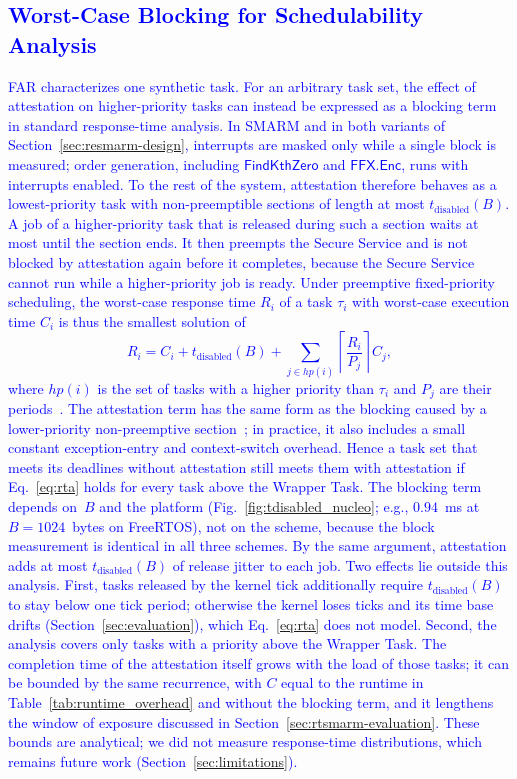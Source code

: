 \documentclass[journal]{IEEEtran}
\newcommand\ben[1]{\textcolor{blue}{#1}}
\begin{document}
\subsection{\ben{Worst-Case Blocking for Schedulability Analysis}}
\label{sec:blocking}
\ben{FAR characterizes one synthetic task.
For an arbitrary task set, the effect of attestation on higher-priority tasks can instead be expressed as a blocking term in standard response-time analysis.
In SMARM and in both variants of Section~\ref{sec:resmarm-design}, interrupts are masked only while a single block is measured; order generation, including $\mathsf{FindKthZero}$ and $\mathsf{FFX.Enc}$, runs with interrupts enabled.
To the rest of the system, attestation therefore behaves as a lowest-priority task with non-preemptible sections of length at most $t_{\text{disabled}}(B)$.
A job of a higher-priority task that is released during such a section waits at most until the section ends.
It then preempts the Secure Service and is not blocked by attestation again before it completes, because the Secure Service cannot run while a higher-priority job is ready.
Under preemptive fixed-priority scheduling, the worst-case response time $R_i$ of a task $\tau_i$ with worst-case execution time $C_i$ is thus the smallest solution of
\begin{equation}
  R_i = C_i + t_{\text{disabled}}(B) + \sum_{j \in hp(i)} \left\lceil \frac{R_i}{P_j} \right\rceil C_j,
  \label{eq:rta}
\end{equation}
where $hp(i)$ is the set of tasks with a higher priority than $\tau_i$ and $P_j$ are their periods~\cite{joseph1986response,audsley1993applying,buttazzo2011hard}.
The attestation term has the same form as the blocking caused by a lower-priority non-preemptive section~\cite{sha1990priority}; in practice, it also includes a small constant exception-entry and context-switch overhead.
Hence a task set that meets its deadlines without attestation still meets them with attestation if Eq.~\eqref{eq:rta} holds for every task above the Wrapper Task.
The blocking term depends on~$B$ and the platform (Fig.~\ref{fig:tdisabled_nucleo}; e.g., $0.94$~ms at $B = 1024$~bytes on FreeRTOS), not on the scheme, because the block measurement is identical in all three schemes.
By the same argument, attestation adds at most $t_{\text{disabled}}(B)$ of release jitter to each job.
Two effects lie outside this analysis.
First, tasks released by the kernel tick additionally require $t_{\text{disabled}}(B)$ to stay below one tick period; otherwise the kernel loses ticks and its time base drifts (Section~\ref{sec:evaluation}), which Eq.~\eqref{eq:rta} does not model.
Second, the analysis covers only tasks with a priority above the Wrapper Task.
The completion time of the attestation itself grows with the load of those tasks; it can be bounded by the same recurrence, with $C$ equal to the runtime in Table~\ref{tab:runtime_overhead} and without the blocking term, and it lengthens the window of exposure discussed in Section~\ref{sec:rtsmarm-evaluation}.
These bounds are analytical; we did not measure response-time distributions, which remains future work (Section~\ref{sec:limitations}).}
\end{document}
